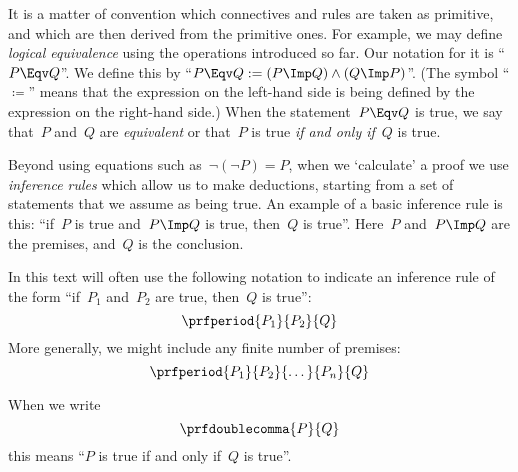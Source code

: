 It is a matter of convention which connectives and rules are taken as primitive, and which are then derived from the primitive ones.
For example, we may define \emph{logical equivalence} using the operations introduced so far.
Our notation for it is ``$P \Eqv Q$''.
We define this by ``$P \Eqv Q := (P \Imp Q) \wedge (Q \Imp P)$''.
(The symbol ``$\coloneqq$'' means that the expression on the left-hand side is being defined by the expression on the right-hand side.)
When the statement~$P \Eqv Q$ is true, we say that~$P$ and~$Q$ are \emph{equivalent} or that~$P$ is true \emph{if and only if}~$Q$ is true.

Beyond using equations such as~$\lnot (\lnot P) = P$, when we `calculate' a proof we use \emph{inference rules} which allow us to make deductions, starting from a set of statements that we assume as being true.
An example of a basic inference rule is this: ``if~$P$ is true and~$P \Imp Q$ is true, then~$Q$ is true''.
Here~$P$ and~$P \Imp Q$ are the premises, and~$Q$ is the conclusion.

In this text will often use the following notation to indicate an inference rule of the form ``if~$P_1$ and~$P_2$ are true, then~$Q$ is true'':
\begin{equation*}
    \prfperiod{
        P_1}{P_2}{Q}
\end{equation*}
More generally, we might include any finite number of premises:
\begin{equation*}
    \prfperiod{
        P_1}{P_2}{\dots}{P_n}{Q}
\end{equation*}

When we write
\begin{equation*}
    \prfdoublecomma{
        P
    }{
        Q
    }
\end{equation*}
this means ``$P$ is true if and only if~$Q$ is true''.
